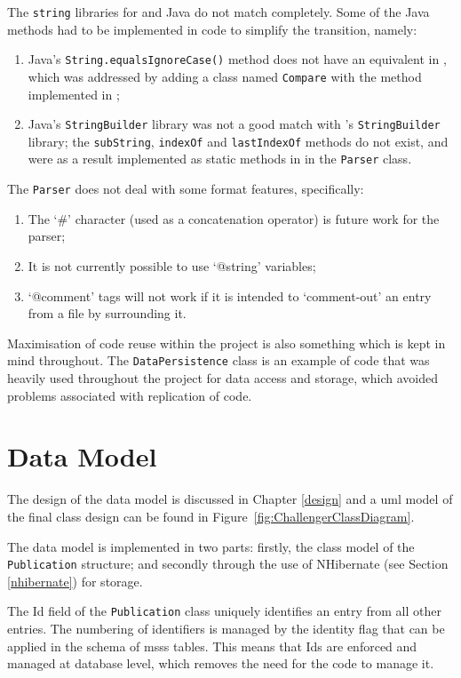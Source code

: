 The \texttt{string} libraries for \cs{} and Java do not match completely.  Some of the Java methods had to be implemented in \cs{} code to simplify the transition, namely:
\begin{enumerate}
	\item Java's \texttt{String.equalsIgnoreCase()} method does not have an equivalent in \cs, which was addressed by adding a class named \texttt{Compare} with the method implemented in \cs;
	\item Java's \texttt{StringBuilder} library was not a good match with \cs's \texttt{StringBuilder} library; the \texttt{subString}, \texttt{indexOf} and \texttt{lastIndexOf} methods do not exist, and were as a result implemented as static methods in \cs{} in the \texttt{Parser} class.
\end{enumerate}

The \texttt{Parser} does not deal with some \bibtex{} format features, specifically:
\begin{enumerate}
	\item The `\#' character (used as a concatenation operator) is future work for the parser;
	\item It is not currently possible to use `@string' variables;
	\item `@comment' tags will not work if it is intended to `comment-out' an entry from a file by surrounding it.
\end{enumerate}

Maximisation of code reuse within the project is also something which is kept in mind throughout.  The \texttt{DataPersistence} class is an example of code that was heavily used throughout the project for data access and storage, which avoided problems associated with replication of code.

\section{Data Model}
\label{dataModel}
The design of the data model is discussed in Chapter \ref{design} and a \gls{uml} model of the final class design can be found in Figure~\ref{fig:ChallengerClassDiagram}.

The data model is implemented in two parts: firstly, the class model of the \texttt{Publication} structure; and secondly through the use of NHibernate (see Section \ref{nhibernate}) for storage.

The Id field of the \texttt{Publication} class uniquely identifies an entry from all other entries.  The numbering of identifiers is managed by the identity flag that can be applied in the schema of \gls{msss} tables.  This means that Ids are enforced and managed at database level, which removes the need for the code to manage it.

